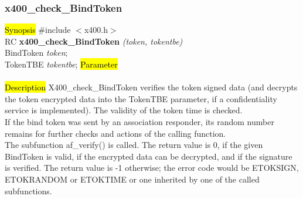 \subsubsection{x400\_check\_BindToken}
\label{x4_ck_BTok}
\hl{Synopsis}
\#include $<$x400.h$>$ \\ [1ex]
RC {\bf x400\_check\_BindToken} {\em (token, tokentbe)} \\
BindToken {\em *token}; \\
TokenTBE {\em *tokentbe};
\hl{Parameter}
 \\[1ex]
 \\[1ex]
\hl{Description}
X400\_check\_BindToken verifies the token signed data
(and decrypts the token encrypted data into the TokenTBE parameter,
if a confidentiality service is implemented).
The validity of the token time is checked.
\\
If the bind token was sent by an association responder,
its random number
remains for further checks and actions of the calling function.
\\
The subfunction af\_verify() is called.
The return value is 0, if the given BindToken is valid,
if the encrypted data can be decrypted,
and if the signature is  verified.
The return value is -1 otherwise;
the error code would be ETOKSIGN, ETOKRANDOM or ETOKTIME
or one inherited by one of the called subfunctions.

